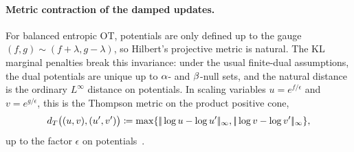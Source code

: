 \paragraph{Metric contraction of the damped updates.}
For balanced entropic OT, potentials are only defined up to the gauge
$(f,g)\sim(f+\lambda,g-\lambda)$, so Hilbert's projective metric is natural.
The KL marginal penalties break this invariance: under the usual finite-dual
assumptions, the dual potentials are unique up to $\alpha$- and $\beta$-null sets,
and the natural distance is the ordinary $L^\infty$ distance on potentials. In
scaling variables $u=e^{f/\epsilon}$ and $v=e^{g/\epsilon}$, this is the
Thompson metric on the product positive cone,
\[
	d_T\big((u,v),(u',v')\big)
	\coloneqq
	\max\{|\!| \log u-\log u' |\!|_\infty,|\!| \log v-\log v' |\!|_\infty\},
\]
up to the factor $\epsilon$ on potentials~\cite{lemmens2012nonlinear}.

